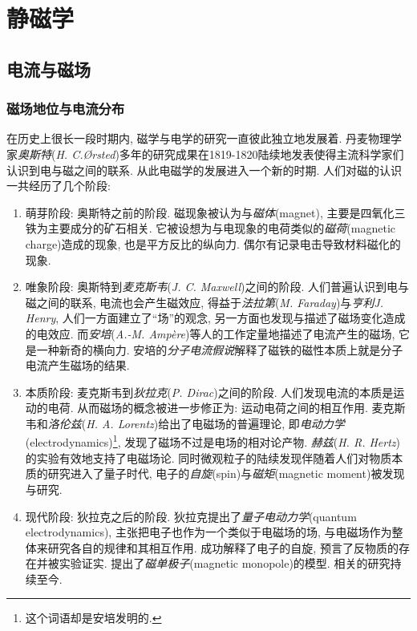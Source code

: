 \chapter{静磁学} 


\section{电流与磁场}

\subsection{磁场地位与电流分布}

在历史上很长一段时期内, 磁学与电学的研究一直彼此独立地发展着. 丹麦物理学家\emph{奥斯特}({\it H. C.\O rsted})多年的研究成果在1819-1820陆续地发表使得主流科学家们认识到电与磁之间的联系. 从此电磁学的发展进入一个新的时期. 人们对磁的认识一共经历了几个阶段:
\begin{enumerate}
\item 萌芽阶段: 奥斯特之前的阶段. 磁现象被认为与\emph{磁体}(magnet), 主要是四氧化三铁为主要成分的矿石相关. 它被设想为与电现象的电荷类似的\emph{磁荷}(magnetic charge)造成的现象, 也是平方反比的纵向力. 偶尔有记录电击导致材料磁化的现象.
\item 唯象阶段: 奥斯特到\emph{麦克斯韦}({\it J. C. Maxwell})之间的阶段. 人们普遍认识到电与磁之间的联系, 电流也会产生磁效应, 得益于\emph{法拉第}({\it M. Faraday})与\emph{亨利}{\it J. Henry}, 人们一方面建立了``场''的观念, 另一方面也发现与描述了磁场变化造成的电效应. 而\emph{安培}({\it A.-M. Amp\`ere})等人的工作定量地描述了电流产生的磁场, 它是一种新奇的横向力. 安培的\emph{分子电流假说}解释了磁铁的磁性本质上就是分子电流产生磁场的结果.
\item 本质阶段: 麦克斯韦到\emph{狄拉克}({\it P. Dirac})之间的阶段. 人们发现电流的本质是运动的电荷. 从而磁场的概念被进一步修正为: 运动电荷之间的相互作用. 麦克斯韦和\emph{洛伦兹}({\it H. A. Lorentz})给出了电磁场的普遍理论, 即\emph{电动力学}(electrodynamics)\footnote{这个词语却是安培发明的.}, 发现了磁场不过是电场的相对论产物. \emph{赫兹}({\it H. R. Hertz})的实验有效地支持了电磁场论. 同时微观粒子的陆续发现伴随着人们对物质本质的研究进入了量子时代, 电子的\emph{自旋}(spin)与\emph{磁矩}(magnetic moment)被发现与研究.
\item 现代阶段: 狄拉克之后的阶段. 狄拉克提出了\emph{量子电动力学}(quantum electrodynamics), 主张把电子也作为一个类似于电磁场的场, 与电磁场作为整体来研究各自的规律和其相互作用. 成功解释了电子的自旋, 预言了反物质的存在并被实验证实. 提出了\emph{磁单极子}(magnetic monopole)的模型. 相关的研究持续至今.
\end{enumerate}

